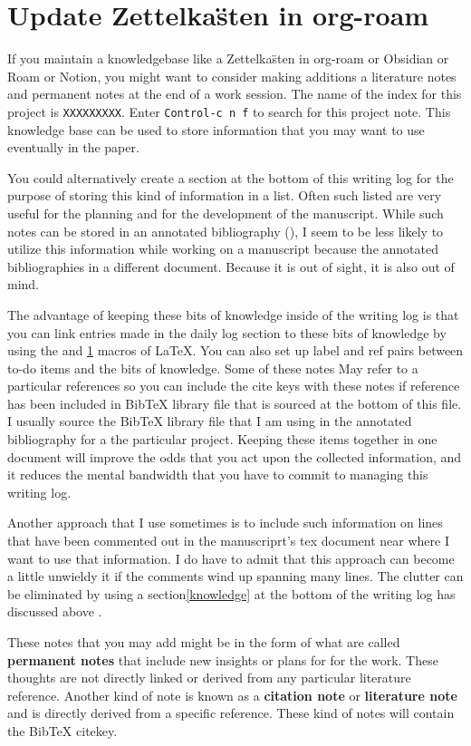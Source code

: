 \documentclass[10pt,letterpaper]{article}
\begin{document}
\section{Update Zettelka\"sten in org-roam}
If you maintain a knowledgebase like a Zettelka\"sten in org-roam or Obsidian or Roam or Notion, you might want to consider making additions a literature notes and permanent notes at the end of a work session.
The name of the index for this project is \verb|XXXXXXXXX|.
Enter \texttt{Control-c n f} to search for this project note.
This knowledge base can be used to store information that you may want to use eventually in the paper.

You could alternatively create a section at the bottom of this writing log for the purpose of storing this kind of information in a list.
Often such listed are very useful for the planning and for the development of the manuscript.
While such notes can be stored in an annotated bibliography (), I seem to be less likely to utilize this information while working on a manuscript because the annotated bibliographies in a different document.
Because it is out of sight, it is also out of mind.

The advantage of keeping these bits of knowledge inside of the writing log is that you can link entries made in the daily log section to these bits of knowledge by using the \label{} and \ref{} macros of LaTeX.
You can also set up label and ref pairs between to-do items and the bits of knowledge.
Some of these notes May refer to a particular references so you can include the cite keys with these notes if reference has been included in BibTeX library file that is sourced at the bottom of this file.
I usually source the BibTeX library file that I am using in the annotated bibliography for a the particular project.
Keeping these items together in one document will improve the odds that you act upon the collected information, and it reduces the mental bandwidth that you have to commit to managing this writing log.

Another approach that I use sometimes is to include such information on lines that have been commented out in the manuscriprt's tex document near where I want to use that information.
I do have to admit that this approach can become a little unwieldy it if the comments wind up spanning many lines.
The clutter can be eliminated by using a section\ref{knowledge} at the bottom of the writing log has discussed above .

These notes that you may add might be in the form of what are called \textbf{permanent notes} that include new insights or plans for for the work.
These thoughts are not directly linked or derived from any particular literature reference.
Another kind of note is known as a \textbf{citation note} or \textbf{literature note} and is directly derived from a specific reference.
These kind of notes will contain the BibTeX citekey.
\end{document}
